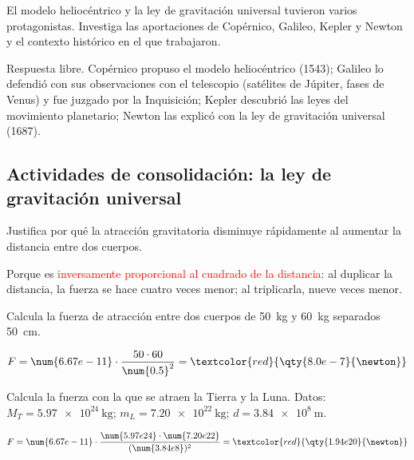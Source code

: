 \begin{exercise}
    El modelo heliocéntrico y la ley de gravitación universal tuvieron varios protagonistas. Investiga las aportaciones de Copérnico, Galileo, Kepler y Newton y el contexto histórico en el que trabajaron.
    \begin{solu}
        Respuesta libre. Copérnico propuso el modelo heliocéntrico (1543); Galileo lo defendió con sus observaciones con el telescopio (satélites de Júpiter, fases de Venus) y fue juzgado por la Inquisición; Kepler descubrió las leyes del movimiento planetario; Newton las explicó con la ley de gravitación universal (1687).
    \end{solu}
\end{exercise}

\subsection*{Actividades de consolidación: la ley de gravitación universal}

\begin{exercise}
    Justifica por qué la atracción gravitatoria disminuye rápidamente al aumentar la distancia entre dos cuerpos.
    \begin{solu}
        Porque es \textcolor{red}{inversamente proporcional al cuadrado de la distancia}: al duplicar la distancia, la fuerza se hace cuatro veces menor; al triplicarla, nueve veces menor.
    \end{solu}
\end{exercise}

\begin{exercise}
    Calcula la fuerza de atracción entre dos cuerpos de \qty{50}{\kg} y \qty{60}{\kg} separados \qty{50}{\cm}.
    \begin{solu}
        \[ F = \num{6.67e-11} \cdot \frac{50 \cdot 60}{\num{0.5}^2} = \textcolor{red}{\qty{8.0e-7}{\newton}} \]
    \end{solu}
\end{exercise}

\begin{exercise}
    Calcula la fuerza con la que se atraen la Tierra y la Luna. Datos: \(M_T = \qty{5.97e24}{\kg}\); \(m_L = \qty{7.20e22}{\kg}\); \(d = \qty{3.84e8}{\m}\).
    \begin{solu}
        \[ F = \num{6.67e-11} \cdot \frac{\num{5.97e24} \cdot \num{7.20e22}}{(\num{3.84e8})^2} = \textcolor{red}{\qty{1.94e20}{\newton}} \]
    \end{solu}
\end{exercise}

